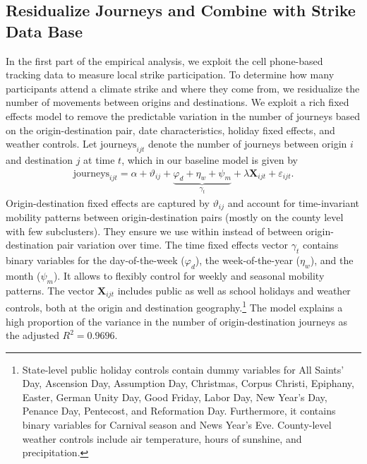 \subsection{Residualize Journeys and Combine with Strike Data Base}



In the first part of the empirical analysis, we exploit the cell phone-based tracking data to measure local strike participation. To determine how many participants attend a climate strike and where they come from, we residualize the number of movements between origins and destinations. We exploit a rich fixed effects model to remove the predictable variation in the number of journeys based on the origin-destination pair, date characteristics, holiday fixed effects, and weather controls. Let $\text{journeys}_{ijt}$ denote the number of journeys between origin $i$ and destination $j$ at time $t$, which in our baseline model is given by 
\begin{align}
\text{journeys}_{ijt} = \alpha + \vartheta_{ij} + \underbrace{\varphi_d+\eta_w+\psi_m}_{\gamma_t} + \lambda \mathbf{X}_{ijt} + \varepsilon_{ijt}. \label{eq_greta_cons:res_journeys}
\end{align}
Origin-destination fixed effects are captured by $\vartheta_{ij}$ and account for time-invariant mobility patterns between origin-destination pairs (mostly on the county level with few subclusters). They ensure we use within instead of between origin-destination pair variation over time. The time fixed effects vector $\gamma_t$ contains binary variables for the day-of-the-week ($\varphi_d$), the week-of-the-year ($\eta_w$), and the month ($\psi_m$). It allows to flexibly control for weekly and seasonal mobility patterns. The vector $\mathbf{X}_{ijt} $ includes public as well as school holidays and weather controls, both at the origin and destination geography.\footnote{State-level public holiday controls contain dummy variables for All Saints' Day, Ascension Day, Assumption Day, Christmas, Corpus Christi, Epiphany, Easter, German Unity Day, Good Friday, Labor Day, New Year's Day, Penance Day, Pentecost, and Reformation Day. Furthermore, it contains binary variables for Carnival season and News Year's Eve. County-level weather controls include air temperature, hours of sunshine, and precipitation.} The model explains a high proportion of the variance in the number of origin-destination journeys as the adjusted $R^2=0.9696$.


